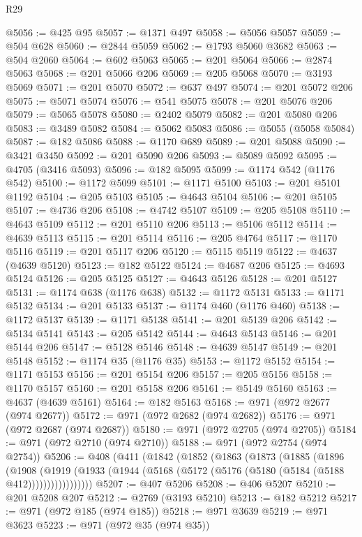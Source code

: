 \begin{lexlean}{R29}
\begin{coremodule}
@5056 := @425 @95
@5057 := @1371 @497
@5058 := @5056 @5057
@5059 := @504 @628
@5060 := @2844 @5059
@5062 := @1793 @5060 @3682
@5063 := @504 @2060
@5064 := @602 @5063
@5065 := @201 @5064
@5066 := @2874 @5063
@5068 := @201 @5066 @206
@5069 := @205 @5068
@5070 := @3193 @5069
@5071 := @201 @5070
@5072 := @637 @497
@5074 := @201 @5072 @206
@5075 := @5071 @5074
@5076 := @541 @5075
@5078 := @201 @5076 @206
@5079 := @5065 @5078
@5080 := @2402 @5079
@5082 := @201 @5080 @206
@5083 := @3489 @5082
@5084 := @5062 @5083
@5086 := @5055 (@5058 @5084)
@5087 := @182 @5086
@5088 := @1170 @689
@5089 := @201 @5088
@5090 := @3421 @3450
@5092 := @201 @5090 @206
@5093 := @5089 @5092
@5095 := @4705 (@3416 @5093)
@5096 := @182 @5095
@5099 := @1174 @542 (@1176 @542)
@5100 := @1172 @5099
@5101 := @1171 @5100
@5103 := @201 @5101 @1192
@5104 := @205 @5103
@5105 := @4643 @5104
@5106 := @201 @5105
@5107 := @4736 @206
@5108 := @4742 @5107
@5109 := @205 @5108
@5110 := @4643 @5109
@5112 := @201 @5110 @206
@5113 := @5106 @5112
@5114 := @4639 @5113
@5115 := @201 @5114
@5116 := @205 @4764
@5117 := @1170 @5116
@5119 := @201 @5117 @206
@5120 := @5115 @5119
@5122 := @4637 (@4639 @5120)
@5123 := @182 @5122
@5124 := @4687 @206
@5125 := @4693 @5124
@5126 := @205 @5125
@5127 := @4643 @5126
@5128 := @201 @5127
@5131 := @1174 @638 (@1176 @638)
@5132 := @1172 @5131
@5133 := @1171 @5132
@5134 := @201 @5133
@5137 := @1174 @460 (@1176 @460)
@5138 := @1172 @5137
@5139 := @1171 @5138
@5141 := @201 @5139 @206
@5142 := @5134 @5141
@5143 := @205 @5142
@5144 := @4643 @5143
@5146 := @201 @5144 @206
@5147 := @5128 @5146
@5148 := @4639 @5147
@5149 := @201 @5148
@5152 := @1174 @35 (@1176 @35)
@5153 := @1172 @5152
@5154 := @1171 @5153
@5156 := @201 @5154 @206
@5157 := @205 @5156
@5158 := @1170 @5157
@5160 := @201 @5158 @206
@5161 := @5149 @5160
@5163 := @4637 (@4639 @5161)
@5164 := @182 @5163
@5168 := @971 (@972 @2677 (@974 @2677))
@5172 := @971 (@972 @2682 (@974 @2682))
@5176 := @971 (@972 @2687 (@974 @2687))
@5180 := @971 (@972 @2705 (@974 @2705))
@5184 := @971 (@972 @2710 (@974 @2710))
@5188 := @971 (@972 @2754 (@974 @2754))
@5206 := @408
    (@411
      (@1842
        (@1852
          (@1863
            (@1873
              (@1885
                (@1896
                  (@1908
                    (@1919
                      (@1933 (@1944 (@5168 (@5172 (@5176 (@5180 (@5184 (@5188 @412)))))))))))))))))
@5207 := @407 @5206
@5208 := @406 @5207
@5210 := @201 @5208 @207
@5212 := @2769 (@3193 @5210)
@5213 := @182 @5212
@5217 := @971 (@972 @185 (@974 @185))
@5218 := @971 @3639
@5219 := @971 @3623
@5223 := @971 (@972 @35 (@974 @35))

\end{coremodule}
\end{lexlean}

